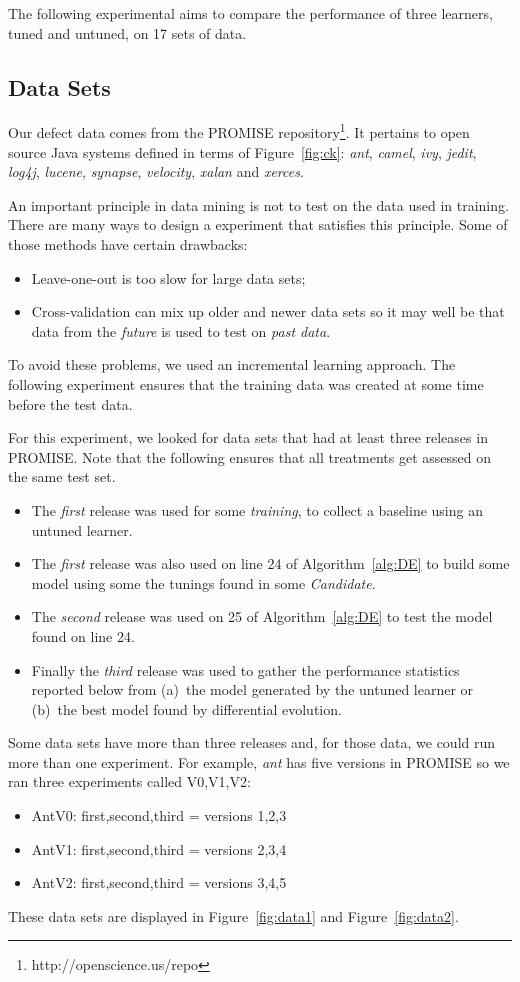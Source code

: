 \documentclass{sig-alternative}
\newcommand{\bi}{\begin{itemize}[leftmargin=0.4cm]}
\newcommand{\ei}{\end{itemize}}
\newcommand{\fig}[1]{Figure~\ref{fig:#1}}
\begin{document}
The following experimental aims to compare the performance of three learners, tuned and untuned, on 17
sets of data. 

\subsection{Data Sets}

Our defect data comes from the PROMISE repository\footnote{http://openscience.us/repo}.
It pertains to 
open source Java systems defined in terms of \fig{ck}:  {\it ant}, {\it camel}, {\it ivy}, {\it jedit}, {\it log4j}, {\it lucene}, {\it 
synapse}, {\it velocity}, {\it xalan} and {\it xerces}. 

An important principle in data mining is not to test on the data used
in training.  There are many ways to design a experiment that satisfies this principle.
Some of those methods have certain drawbacks:
\bi
\item  Leave-one-out is too slow for large data sets;
\item Cross-validation can mix up older and newer data sets so it may well be that
data from the {\em future} is used to test on {\em past data}.
\ei
To avoid these problems, we used an incremental learning approach. The following
experiment ensures that the training data was created at some time before the test
data.

For this experiment, we looked for data sets that had at least three  
releases in PROMISE. Note that the following ensures that all treatments 
get assessed on the same test  set.
\bi 
\item The {\em first} release was used for some  {\em training}, to collect a baseline
   using an untuned learner.
   \item
   The {\em first} release was also used  on line 24 of Algorithm~\ref{alg:DE} to
   build some model using some the tunings found in some {\em Candidate}.
   \item The {\em second} release was used on 25 of Algorithm~\ref{alg:DE} to 
   test the model found on line 24.
   \item Finally the {\em third} release was used to gather the performance statistics
   reported below from (a)~the model generated by the untuned learner or (b)~the
   best model found by differential evolution.
   \ei
Some data sets have more than three releases and, for those data, we could run more
 than one experiment. For example, {\em ant} has five versions in PROMISE so
 we ran three experiments called V0,V1,V2:
 \bi
 \item AntV0: first,second,third = versions 1,2,3
 \item AntV1: first,second,third = versions 2,3,4
 \item AntV2: first,second,third = versions 3,4,5
 \ei 
These data sets are displayed in \fig{data1} and \fig{data2}.
\end{document}
